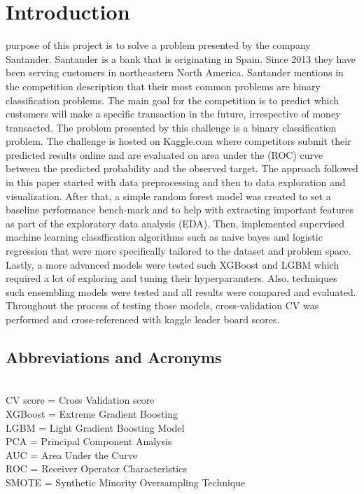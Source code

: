 \documentclass[journal,twoside,web]{ieeecolor}
\begin{document}
\section{Introduction}
\label{sec:introduction}
 purpose of this project is to solve a problem presented by the company Santander. Santander is a bank that is originating in Spain. Since 2013 they have been serving customers in northeastern North America. Santander mentions in the competition description that their most common problems are binary classification problems. The main goal for the competition is to predict which customers will make a specific transaction in the future, irrespective of money transacted. The problem presented by this challenge is a binary classification problem. The challenge is hosted on Kaggle.com where competitors submit their predicted results online and are evaluated on area under the (ROC) curve between the predicted probability and the observed target. The approach followed in this paper started with data preprocessing and then to data exploration and visualization. After that, a simple random forest model was created to set a baseline performance bench-mark and to help with extracting important features as part of the exploratory data analysis (EDA). Then, implemented supervised machine learning classffication algorithms such as naive bayes and logistic regression that were more specifically tailored to the dataset and problem space. Lastly, a more advanced models were tested such XGBoost and LGBM which required a lot of exploring and tuning their hyperparamters. Also, techniques such ensembling models were tested and all results were compared and evaluated. Throughout the process of testing those models, cross-validation CV was performed and cross-referenced with kaggle leader board scores.

\subsection{Abbreviations and Acronyms}\\
CV score = Cross Validation score \\
XGBoost = Extreme Gradient Boosting  \\
LGBM = Light Gradient Boosting Model \\
PCA = Principal Component Analysis \\
AUC = Area Under the Curve \\
ROC = Receiver Operator Characteristics \\
SMOTE = Synthetic Minority Oversampling Technique 
\end{document}
